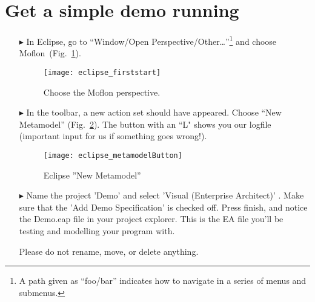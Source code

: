 \section{Get a simple demo running} %
\label{stepThree}

\begin{enumerate}
\item[$\blacktriangleright$] In Eclipse, go to ``Window/Open Perspective/Other\ldots''\footnote{A path given as ``foo/bar'' indicates how to navigate in a series of menus and submenus.} and choose Moflon~(Fig.~\ref{fig_eclipse}).

\begin{figure}[htbp]
	\centering
  \texttt{[image: eclipse\_firststart]}
	\caption{Choose the Moflon perspective.}
	\label{fig_eclipse}
\end{figure} 

\item[$\blacktriangleright$] In the toolbar, a new action set should have appeared. Choose ``New Metamodel'' (Fig.~\ref{fig_eclipseNewMetamodel}).
The button with an ``L" shows you our logfile (important input for us if something goes wrong!).

\begin{figure}[htbp]
	\centering
  \texttt{[image: eclipse\_metamodelButton]}
	\caption{Eclipse ''New Metamodel''}
	\label{fig_eclipseNewMetamodel}
\end{figure}
 
\item[$\blacktriangleright$] Name the project 'Demo' and select 'Visual (Enterprise Architect)' . Make sure that the 'Add Demo Specification' is checked off. Press finish, and notice the Demo.eap file in your project explorer. This is the EA file you'll be testing and modelling your program with.

Please do not rename, move, or delete anything.

\clearpage
\texHeader
\mbox{}
\clearpage


\visHeader



\end{enumerate}
